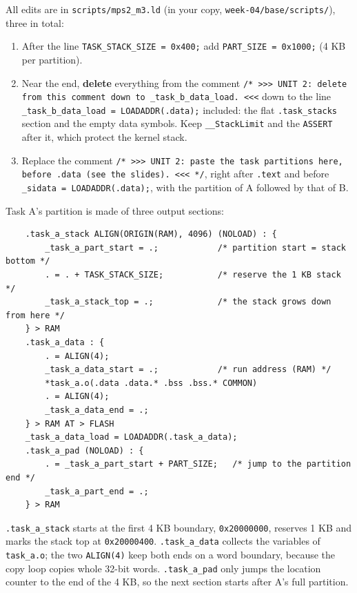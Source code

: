 All edits are in \texttt{scripts/mps2\_m3.ld} (in your copy, \texttt{week-04/base/scripts/}), three in total:

\begin{enumerate}
    \item After the line \texttt{TASK\_STACK\_SIZE = 0x400;} add \texttt{PART\_SIZE = 0x1000;} (4 KB per partition).
    \item Near the end, \textbf{delete} everything from the comment \texttt{/* >>> UNIT 2: delete from this comment down to \_task\_b\_data\_load. <<<} down to the line \texttt{\_task\_b\_data\_load = LOADADDR(.data);} included: the flat \texttt{.task\_stacks} section and the empty data symbols. Keep \texttt{\_\_StackLimit} and the \texttt{ASSERT} after it, which protect the kernel stack.
    \item Replace the comment \texttt{/* >>> UNIT 2: paste the task partitions here, before .data (see the slides). <<< */}, right after \texttt{.text} and before \texttt{\_sidata = LOADADDR(.data);}, with the partition of A followed by that of B.
\end{enumerate}

Task A's partition is made of three output sections:

\begin{lstlisting}
    .task_a_stack ALIGN(ORIGIN(RAM), 4096) (NOLOAD) : {
        _task_a_part_start = .;            /* partition start = stack bottom */
        . = . + TASK_STACK_SIZE;           /* reserve the 1 KB stack */
        _task_a_stack_top = .;             /* the stack grows down from here */
    } > RAM
    .task_a_data : {
        . = ALIGN(4);
        _task_a_data_start = .;            /* run address (RAM) */
        *task_a.o(.data .data.* .bss .bss.* COMMON)
        . = ALIGN(4);
        _task_a_data_end = .;
    } > RAM AT > FLASH
    _task_a_data_load = LOADADDR(.task_a_data);
    .task_a_pad (NOLOAD) : {
        . = _task_a_part_start + PART_SIZE;   /* jump to the partition end */
        _task_a_part_end = .;
    } > RAM
\end{lstlisting}

\texttt{.task\_a\_stack} starts at the first 4 KB boundary, \texttt{0x20000000}, reserves 1 KB and marks the stack top at \texttt{0x20000400}. \texttt{.task\_a\_data} collects the variables of \texttt{task\_a.o}; the two \texttt{ALIGN(4)} keep both ends on a word boundary, because the copy loop copies whole 32-bit words. \texttt{.task\_a\_pad} only jumps the location counter to the end of the 4 KB, so the next section starts after A's full partition.

